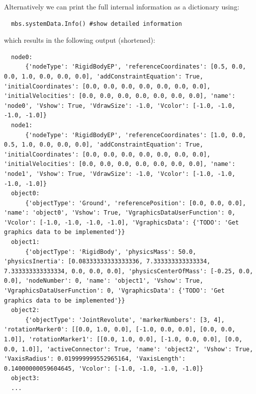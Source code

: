 Alternatively we can print the full internal information as a dictionary using:
\pythonstyle\begin{lstlisting}
  mbs.systemData.Info() #show detailed information
\end{lstlisting}
which results in the following output (shortened):
\plainlststyle
\begin{lstlisting}
  node0:
      {'nodeType': 'RigidBodyEP', 'referenceCoordinates': [0.5, 0.0, 0.0, 1.0, 0.0, 0.0, 0.0], 'addConstraintEquation': True, 'initialCoordinates': [0.0, 0.0, 0.0, 0.0, 0.0, 0.0, 0.0], 'initialVelocities': [0.0, 0.0, 0.0, 0.0, 0.0, 0.0, 0.0], 'name': 'node0', 'Vshow': True, 'VdrawSize': -1.0, 'Vcolor': [-1.0, -1.0, -1.0, -1.0]}
  node1:
      {'nodeType': 'RigidBodyEP', 'referenceCoordinates': [1.0, 0.0, 0.5, 1.0, 0.0, 0.0, 0.0], 'addConstraintEquation': True, 'initialCoordinates': [0.0, 0.0, 0.0, 0.0, 0.0, 0.0, 0.0], 'initialVelocities': [0.0, 0.0, 0.0, 0.0, 0.0, 0.0, 0.0], 'name': 'node1', 'Vshow': True, 'VdrawSize': -1.0, 'Vcolor': [-1.0, -1.0, -1.0, -1.0]}
  object0:
      {'objectType': 'Ground', 'referencePosition': [0.0, 0.0, 0.0], 'name': 'object0', 'Vshow': True, 'VgraphicsDataUserFunction': 0, 'Vcolor': [-1.0, -1.0, -1.0, -1.0], 'VgraphicsData': {'TODO': 'Get graphics data to be implemented'}}
  object1:
      {'objectType': 'RigidBody', 'physicsMass': 50.0, 'physicsInertia': [0.08333333333333336, 7.333333333333334, 7.333333333333334, 0.0, 0.0, 0.0], 'physicsCenterOfMass': [-0.25, 0.0, 0.0], 'nodeNumber': 0, 'name': 'object1', 'Vshow': True, 'VgraphicsDataUserFunction': 0, 'VgraphicsData': {'TODO': 'Get graphics data to be implemented'}}
  object2:
      {'objectType': 'JointRevolute', 'markerNumbers': [3, 4], 'rotationMarker0': [[0.0, 1.0, 0.0], [-1.0, 0.0, 0.0], [0.0, 0.0, 1.0]], 'rotationMarker1': [[0.0, 1.0, 0.0], [-1.0, 0.0, 0.0], [0.0, 0.0, 1.0]], 'activeConnector': True, 'name': 'object2', 'Vshow': True, 'VaxisRadius': 0.019999999552965164, 'VaxisLength': 0.14000000059604645, 'Vcolor': [-1.0, -1.0, -1.0, -1.0]}
  object3:
  ...
\end{lstlisting}

